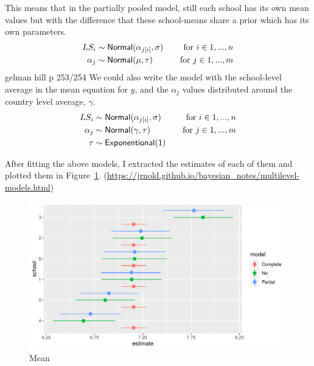 \documentclass[a4, 12pt]{article}
\begin{document}
This means that in the partially pooled model, still each school has its own mean values but with the difference that these school-means share a prior which has its own parameters.
\begin{align*}
LS_i & \sim {\sf Normal} (\alpha_{j[i]}, \sigma) & \quad \text{for } i \in 1,...,n \\
\alpha_{j} & \sim {\sf Normal} (\mu, \tau) & \quad \text{for } j \in 1,...,m
\end{align*} gelman hill p 253/254
We could also write the model with the school-level average in the mean equation for \(y\), and the \(\alpha_j\) values distributed around the country level average, \(\gamma\).
\begin{align*}
LS_i & \sim {\sf Normal} (\alpha_{j[i]}, \sigma) & \quad \text{for } i \in 1,...,n \\
\alpha_{j} & \sim {\sf Normal} (\gamma, \tau) & \quad \text{for } j \in 1,...,m \\
\tau & \sim {\sf Exponentional(1)}
\end{align*}

After fitting the above models, I extracted the estimates of each of them and plotted them in Figure~\ref{fig:compare-models}. (\url{https://jrnold.github.io/bayesian_notes/multilevel-models.html})

\begin{figure}[H]

{\centering \includegraphics[width=0.8\linewidth,]{../figures/compare_models} 

}

\caption{Mean}\label{fig:compare-models}
\end{figure}
\end{document}
